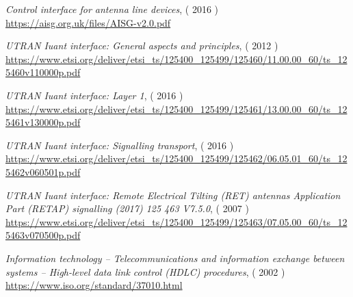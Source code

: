 \cleardoublepage
{}
{}


\begin{thebibliography}{99}
  \emph{Control interface for antenna line devices},
  ( 2016 )
  \newline
  \url{https://aisg.org.uk/files/AISG-v2.0.pdf}

  \emph{UTRAN Iuant interface: General aspects and principles},
  ( 2012 )
  \newline
  \url{https://www.etsi.org/deliver/etsi_ts/125400_125499/125460/11.00.00_60/ts_125460v110000p.pdf}
  
  \emph{UTRAN Iuant interface: Layer 1},
  ( 2016 )
  \newline
  \url{https://www.etsi.org/deliver/etsi_ts/125400_125499/125461/13.00.00_60/ts_125461v130000p.pdf}

  \emph{UTRAN Iuant interface: Signalling transport},
  ( 2016 )
  \newline
  \url{https://www.etsi.org/deliver/etsi_ts/125400_125499/125462/06.05.01_60/ts_125462v060501p.pdf}

  \emph{UTRAN Iuant interface: Remote Electrical Tilting (RET)
antennas Application Part (RETAP) signalling (2017) 125 463 V7.5.0},
  ( 2007 )
  \newline
  \url{https://www.etsi.org/deliver/etsi_ts/125400_125499/125463/07.05.00_60/ts_125463v070500p.pdf}
  
  \emph{Information technology -- Telecommunications and information exchange between systems -- High-level data link control (HDLC) procedures},
  ( 2002 )
  \newline
  \url{https://www.iso.org/standard/37010.html}

\end{thebibliography}


